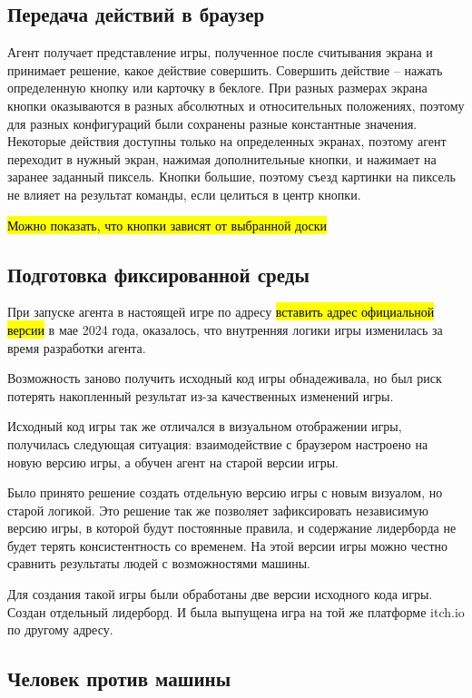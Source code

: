\documentclass{article}
\begin{document}
\subsection{Передача действий в браузер}

Агент получает представление игры, полученное после считывания экрана и принимает решение, какое действие совершить.
Совершить действие -- нажать определенную кнопку или карточку в беклоге.
При разных размерах экрана кнопки оказываются в разных абсолютных и относительных положениях, поэтому для разных конфигураций были сохранены разные константные значения.
Некоторые действия доступны только на определенных экранах, поэтому агент переходит в нужный экран, нажимая дополнительные кнопки, и нажимает на заранее заданный пиксель.
Кнопки большие, поэтому съезд картинки на пиксель не влияет на результат команды, если целиться в центр кнопки.

\hl{Можно показать, что кнопки зависят от выбранной доски}

\subsection{Подготовка фиксированной среды}

При запуске агента в настоящей игре по адресу \hl{вставить адрес официальной версии} в мае 2024 года, оказалось, что внутренняя логики игры изменилась за время разработки агента.

Возможность заново получить исходный код игры обнадеживала, но был риск потерять накопленный результат из-за качественных изменений игры.

Исходный код игры так же отличался в визуальном отображении игры, получилась следующая ситуация: взаимодействие с браузером настроено на новую версию игры, а обучен агент на старой версии игры.

Было принято решение создать отдельную версию игры с новым визуалом, но старой логикой.
Это решение так же позволяет зафиксировать независимую версию игры, в которой будут постоянные правила, и содержание лидерборда не будет терять консистентность со временем.
На этой версии игры можно честно сравнить результаты людей с возможностями машины.

Для создания такой игры были обработаны две версии исходного кода игры.
Создан отдельный лидерборд.
И была выпущена игра на той же платформе itch.io по другому адресу.

\subsection{Человек против машины}
\end{document}
